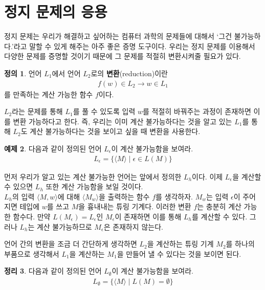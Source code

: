 \documentclass[b5paper, 11pt]{book}
\theoremstyle{definition}
\newtheorem{defn}{정의}[chapter]
\newtheorem{thm}[defn]{정리}
\newtheorem{ex}[defn]{예제}
\newenvironment{pf*}{\pushQED{\qed}\pf}
{\popQED\endpf}
\begin{document}
\section{정지 문제의 응용}
정지 문제는 우리가 해결하고 싶어하는 컴퓨터 과학의 문제들에 대해서 `그건 불가능하다.'라고 말할 수 있게
해주는 아주 좋은 증명 도구이다. 우리는 정지 문제를 이용해서 다양한 문제를 증명할 것이기 때문에
그 문제를 적절히 변환시켜줄 필요가 있다.
\begin{defn}
    언어 $L_1$에서 언어 $L_2$로의 \textbf{변환}(reduction)이란 
    \begin{align*}
        f(w) \in L_2 \rightarrow w \in L_1 
    \end{align*}
    를 만족하는 계산 가능한 함수 $f$이다.
\end{defn}
$L_2$라는 문제를 통해 $L_1$를 풀 수 있도록 입력 $w$를 적절히 바꿔주는 과정이 존재하면
이를 변환 가능하다고 한다. 즉, 우리는 이미 계산 불가능하다는 것을 알고 있는 $L_1$를 통해
$L_2$도 계산 불가능하다는 것을 보이고 싶을 때 변환을 사용한다. 
\begin{ex}
    다음과 같이 정의된 언어 $L_\epsilon$이 계산 불가능함을 보여라.
    \begin{align*}
        L_\epsilon = \{ \langle M \rangle \;\vert\; \epsilon \in L(M) \}
    \end{align*}
\end{ex}
\begin{pf*}
    먼저 우리가 알고 있는 계산 불가능한 언어는 앞에서 정의한 $L_h$이다. 이제 $L_\epsilon$을
    계산할 수 있으면 $L_h$ 또한 계산 가능함을 보일 것이다. 
    \\ $L_h$의 입력 $\langle M , w\rangle$에 대해 $\langle M_w \rangle$을 출력하는 
    함수 $f$를 생각하자. $M_w$는 입력 $\epsilon$이 주어지면 테입에 $w$를 쓰고 
    $M$을 흉내내는 튜링 기계다. 이러한 변환 $f$는 충분히 계산 가능한 함수다. 
    만약 $L(M_\epsilon) = L_\epsilon$인 $M_\epsilon$이 존재하면 이를 통해 
    $L_h$를 계산할 수 있다. 그러나 $L_h$는 계산 불가능하므로 $M_\epsilon$은 존재하지
    않는다.
\end{pf*}
언어 간의 변환을 조금 더 간단하게 생각하면 $L_2$을 계산하는 튜링 기계 $M_2$를 하나의 
부품으로 생각해서 $L_1$을 계산하는 $M_1$을 만들어 낼 수 있다는 것을 보이면 된다.
\begin{thm}
    다음과 같이 정의된 언어 $L_\emptyset$이 계산 불가능함을 보여라.
    \begin{align*}
        L_\emptyset = \{ \langle M \rangle \;\vert\; L(M) = \emptyset \}
    \end{align*}
\end{thm}
\end{document}
